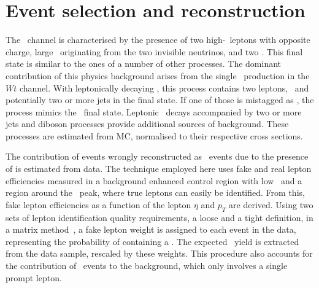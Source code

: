 \section{Event selection and reconstruction}
\label{sect:evselreco7TeV}
%
The \ttbarll\ channel is characterised by the presence of two high-\pt\ leptons with opposite charge, large \met\ originating from the two invisible neutrinos, and two . 
%
This final state is similar to the ones of a number of other processes. The dominant contribution of this physics background arises from the single \tquark\ production in the $Wt$ channel. With leptonically decaying , this process contains two leptons, \met\ and potentially two or more jets in the final state. If one of those is mistagged as \bjet, the process mimics the \dil\ final state. 
%
Leptonic \Zboson\ decays accompanied by two or more jets and diboson processes provide additional sources of background. 
%
These processes are estimated from \gls{MC}, normalised to their respective cross sections. 
%

The contribution of events wrongly reconstructed as \ttbarll\ events due to the presence of  is estimated from data. 
%
The technique employed here uses fake and real lepton efficiencies measured in a background enhanced control region with low \met\ and a region around the \Zboson\ peak, where true leptons can easily be identified. 
%
From this, fake lepton efficiencies as a function of the lepton $\eta$ and $p_T$ are derived.
%
Using two sets of lepton identification quality requirements, a loose and a tight definition, in a matrix method~\cite{Aad:2010ey}, a fake lepton weight is assigned to each event in the data, representing the probability of containing a \fake. 
%
The expected \fake\ yield is extracted from the data sample, rescaled by these weights.
%
This procedure also accounts for the contribution of \Wj\ events to the background, which only involves a single prompt lepton.










